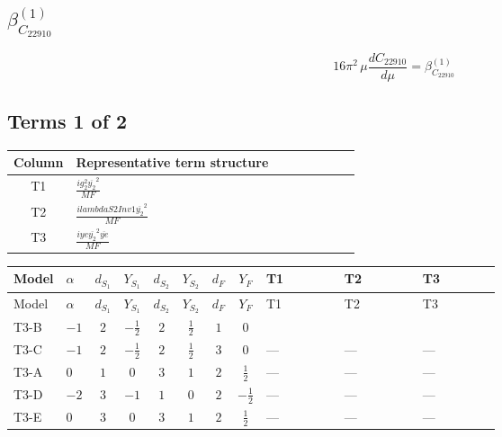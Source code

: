 \documentclass[8pt]{article}
\begin{document}
\begin{landscape}
\section*{$\beta_{C_{22910}}^{(1)}$}
\[16\pi^2\,\mu\frac{d C_{22910}}{d\mu}=\beta_{C_{22910}}^{(1)}\]
\subsection*{Terms 1 of 2}
\begin{center}
\begin{tabular}{@{}c >{\raggedright\arraybackslash}p{0.82\linewidth}@{}}
\toprule
Column & Representative term structure \\
\midrule
T1 & \(\displaystyle \frac{i g_{2}^{2} \overline{y_{2}}^{2}}{MF}\) \\
\midrule
T2 & \(\displaystyle \frac{i lambdaS2Inv1 \overline{y_{2}}^{2}}{MF}\) \\
\midrule
T3 & \(\displaystyle \frac{i ye \overline{y_{2}}^{2} \overline{ye}}{MF}\) \\
\midrule
\bottomrule
\end{tabular}
\end{center}
\smallskip
\tiny
\begin{longtable}{@{}llcccccc >{\raggedright\arraybackslash}p{0.21\linewidth} >{\raggedright\arraybackslash}p{0.21\linewidth} >{\raggedright\arraybackslash}p{0.21\linewidth}@{}}
\toprule
Model & $\alpha$ & $d_{S_1}$ & $Y_{S_1}$ & $d_{S_2}$ & $Y_{S_2}$ & $d_F$ & $Y_F$ & T1 & T2 & T3 \\
\midrule
\endfirsthead
\toprule
Model & $\alpha$ & $d_{S_1}$ & $Y_{S_1}$ & $d_{S_2}$ & $Y_{S_2}$ & $d_F$ & $Y_F$ & T1 & T2 & T3 \\
\midrule
\endhead
T3-B & $-1$ & $2$ & $-\frac{1}{2}$ & $2$ & $\frac{1}{2}$ & $1$ & $0$ & \scriptsize\adjustbox{max width=\linewidth}{$\begin{gathered} - \frac{3 i g_{2}^{2} \overline{y_{2}}^{2}}{4 MF}\end{gathered}$} & \scriptsize\adjustbox{max width=\linewidth}{$\begin{gathered} - \frac{i lambdaS2Inv1 \overline{y_{2}}^{2}}{2 MF}\end{gathered}$} & \scriptsize\adjustbox{max width=\linewidth}{$\begin{gathered} \frac{i ye \overline{y_{2}}^{2} \overline{ye}}{4 MF}\end{gathered}$} \\
\midrule
T3-C & $-1$ & $2$ & $-\frac{1}{2}$ & $2$ & $\frac{1}{2}$ & $3$ & $0$ & --- & --- & --- \\
\midrule
T3-A & $0$ & $1$ & $0$ & $3$ & $1$ & $2$ & $\frac{1}{2}$ & --- & --- & --- \\
\midrule
T3-D & $-2$ & $3$ & $-1$ & $1$ & $0$ & $2$ & $-\frac{1}{2}$ & --- & --- & --- \\
\midrule
T3-E & $0$ & $3$ & $0$ & $3$ & $1$ & $2$ & $\frac{1}{2}$ & --- & --- & --- \\
\midrule
\bottomrule
\end{longtable}
\clearpage

\end{landscape}
\end{document}
